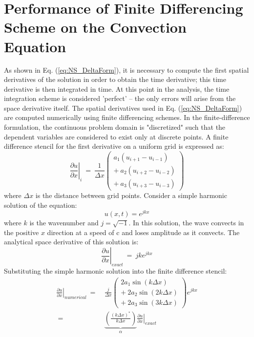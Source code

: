 \documentclass[conf]{new-aiaa}
\begin{document}
\section{Performance of Finite Differencing Scheme on the Convection Equation}
As shown in Eq. (\ref{eq:NS_DeltaForm}), it is necessary to compute the first spatial derivatives of the solution in order to obtain the time derivative; this time derivative is then integrated in time. 
At this point in the analysis, the time integration scheme is considered 'perfect' – the only errors will arise from the space derivative itself.
The spatial derivatives used in Eq. (\ref{eq:NS_DeltaForm}) are computed numerically using finite differencing schemes.
In the finite-difference formulation, the continuous problem domain is "discretized" such that the dependent variables are considered to exist only at discrete points.  
A finite difference stencil for the first derivative on a uniform grid is expressed as:
\begin{equation*}
	\left.\frac{\partial{u}}{\partial{x}}\right|_{i}
	~=~\frac{1}{\Delta{x}}
	\left(\begin{matrix}
		a_1\left(u_{i+1} - u_{i-1}\right) \\
		+~a_2\left(u_{i+2} - u_{i-2}\right) \\
		+~a_3\left(u_{i+3} - u_{i-3}\right)
	\end{matrix}\right)
\end{equation*}
where $\Delta{x}$ is the distance between grid points. Consider a simple harmonic solution of the equation:
\begin{equation*}
	u(x, t) = e^{jkx}
\end{equation*}
where $k$ is the wavenumber and $j=\sqrt{-1}$. In this solution, the wave convects in the positive $x$ direction at a speed of c and loses amplitude as it convects. The analytical space derivative of this solution is:
\begin{equation*}
	\left.\frac{\partial{u}}{\partial{x}}\right|_{exact}~=~jke^{jkx}
\end{equation*}
Substituting the simple harmonic solution into the finite difference stencil:
\begin{equation*}
	\begin{split}
		\left.\frac{\partial{u}}{\partial{x}}\right|_{numerical}~=&~\frac{j}{\Delta{x}}
	\left(\begin{matrix}
		2a_1\sin\left(k\Delta{x}\right) \\
		+~2a_2\sin\left(2k\Delta{x}\right) \\
		+~2a_3\sin\left(3k\Delta{x}\right)
	\end{matrix}\right)e^{jkx} \\
		~=&~\underbrace{\left(\frac{\left(k\Delta{x}\right)^*}{k\Delta{x}} \right)}_{\alpha}\left.\frac{\partial{u}}{\partial{x}}\right|_{exact}
	\end{split}
\end{equation*}
\end{document}
